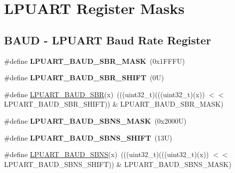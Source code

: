 \hypertarget{group___l_p_u_a_r_t___register___masks}{}\section{L\+P\+U\+A\+RT Register Masks}
\label{group___l_p_u_a_r_t___register___masks}
\subsection*{B\+A\+UD -\/ L\+P\+U\+A\+RT Baud Rate Register}
\begin{DoxyCompactItemize}
\item 
\mbox{\label{group___l_p_u_a_r_t___register___masks_gaf5ebc9e0bbd9cfb0461c2e47c882dfd2}} 
\#define {\bfseries L\+P\+U\+A\+R\+T\+\_\+\+B\+A\+U\+D\+\_\+\+S\+B\+R\+\_\+\+M\+A\+SK}~(0x1\+F\+F\+F\+U)
\item 
\mbox{\label{group___l_p_u_a_r_t___register___masks_ga1792ebb16e8fa96c046706414e68536b}} 
\#define {\bfseries L\+P\+U\+A\+R\+T\+\_\+\+B\+A\+U\+D\+\_\+\+S\+B\+R\+\_\+\+S\+H\+I\+FT}~(0\+U)
\item 
\#define \mbox{\hyperlink{group___l_p_u_a_r_t___register___masks_ga2d4fd833faa90292e6098e9d0d618e8c}{L\+P\+U\+A\+R\+T\+\_\+\+B\+A\+U\+D\+\_\+\+S\+BR}}(x)~(((uint32\+\_\+t)(((uint32\+\_\+t)(x)) $<$$<$ L\+P\+U\+A\+R\+T\+\_\+\+B\+A\+U\+D\+\_\+\+S\+B\+R\+\_\+\+S\+H\+I\+FT)) \& L\+P\+U\+A\+R\+T\+\_\+\+B\+A\+U\+D\+\_\+\+S\+B\+R\+\_\+\+M\+A\+SK)
\item 
\mbox{\label{group___l_p_u_a_r_t___register___masks_ga728723a3258162036c6f4665bce313f6}} 
\#define {\bfseries L\+P\+U\+A\+R\+T\+\_\+\+B\+A\+U\+D\+\_\+\+S\+B\+N\+S\+\_\+\+M\+A\+SK}~(0x2000\+U)
\item 
\mbox{\label{group___l_p_u_a_r_t___register___masks_gace90162bfb929a75c628e763a2b48d64}} 
\#define {\bfseries L\+P\+U\+A\+R\+T\+\_\+\+B\+A\+U\+D\+\_\+\+S\+B\+N\+S\+\_\+\+S\+H\+I\+FT}~(13\+U)
\item 
\#define \mbox{\hyperlink{group___l_p_u_a_r_t___register___masks_ga0efd4bf18057e642f69d0b2653aca64f}{L\+P\+U\+A\+R\+T\+\_\+\+B\+A\+U\+D\+\_\+\+S\+B\+NS}}(x)~(((uint32\+\_\+t)(((uint32\+\_\+t)(x)) $<$$<$ L\+P\+U\+A\+R\+T\+\_\+\+B\+A\+U\+D\+\_\+\+S\+B\+N\+S\+\_\+\+S\+H\+I\+FT)) \& L\+P\+U\+A\+R\+T\+\_\+\+B\+A\+U\+D\+\_\+\+S\+B\+N\+S\+\_\+\+M\+A\+SK)

\end{DoxyCompactItemize}
